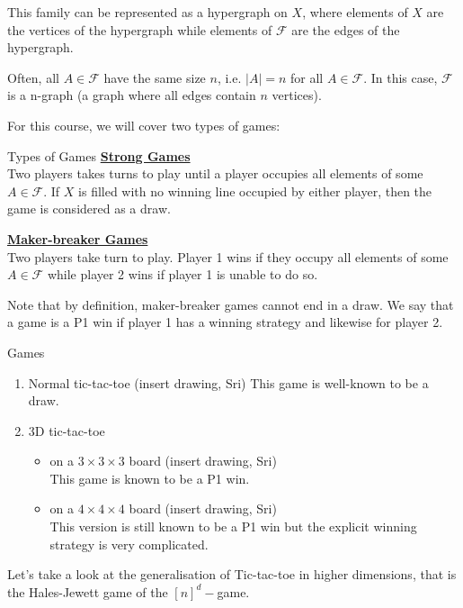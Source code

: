 \documentclass[12pt]{article}
\begin{document}
This family can be represented as a hypergraph on $X$, where elements of $X$ are the vertices of the hypergraph while elements of $\mathcal{F}$ are the edges of the hypergraph. 

Often, all \(A \in \mathcal{F}\) have the same size \(n\), i.e. $|A| = n$ for all \(A \in \mathcal{F}\). In this case, $\mathcal{F}$ is a n-graph (a graph where all edges contain \(n\) vertices).

For this course, we will cover two types of games:
\begin{definition}[label=game_types]{Types of Games}
    \underline{\textbf{Strong Games}} \\
    Two players takes turns to play until a player occupies all elements of some \(A \in \mathcal{F}\). If \(X\) is filled with no winning line occupied by either player, then the game is considered as a draw.
    
    \underline{\textbf{Maker-breaker Games}}\\
    Two players take turn to play. Player 1 wins if they occupy all elements of some \(A \in \mathcal{F}\) while player 2 wins if player 1 is unable to do so.
\end{definition}

Note that by definition, maker-breaker games cannot end in a draw. We say that a game is a P1 win if player 1 has a winning strategy and likewise for player 2.

\begin{example}[label=ex_game]{Games}
\begin{enumerate}
    \item Normal tic-tac-toe (insert drawing, Sri)
    This game is well-known to be a draw. 
    \item 3D tic-tac-toe 
    \begin{itemize}
        \item on a $3\times3\times3$ board (insert drawing, Sri)\\
        This game is known to be a P1 win.
        \item on a $4\times4\times4$ board (insert drawing, Sri)\\
        This version is still known to be a P1 win but the explicit winning strategy is very complicated.
    \end{itemize}
\end{enumerate}
\end{example}

Let's take a look at the generalisation of Tic-tac-toe in higher dimensions, that is the Hales-Jewett game of the $[n]^d-$game.
\end{document}
